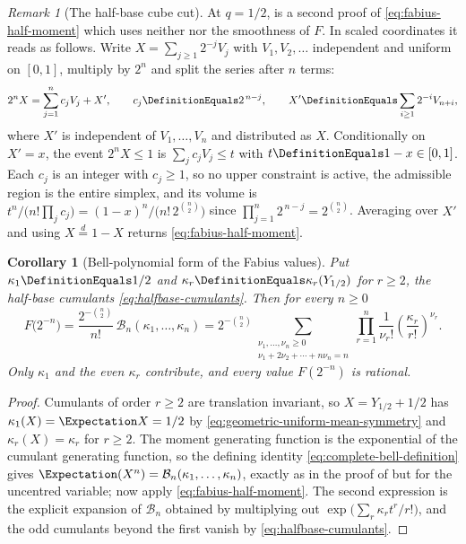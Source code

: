 \documentclass[11pt,a4paper,oneside,openany]{book}
\newtheorem{corollary}[corollary]{Corollary}
\theoremstyle{definition}
\theoremstyle{remark}
\newtheorem{remark}[remark]{Remark}
\begin{document}
\begin{remark}[The half-base cube cut]\label{rem:half-moment-cube-cut}
At $q=1/2$,  is a second proof of
\eqref{eq:fabius-half-moment} which uses neither  nor the smoothness
of $F$.  In scaled coordinates it reads as follows.  Write $X=\sum_{j\ge1}2^{-j}V_j$ with
$V_1,V_2,\ldots$ independent and uniform on $[0,1]$, multiply by $2^n$ and split the
series after $n$ terms:
\begin{equation}\label{eq:fabius-scaled-split}
 2^nX=\sum_{j=1}^{n}c_jV_j+X',
 \qquad c_j\DefinitionEquals2^{\,n-j},
 \qquad X'\DefinitionEquals\sum_{i\ge1}2^{-i}V_{n+i},
\end{equation}
where $X'$ is independent of $V_1,\ldots,V_n$ and distributed as $X$.  Conditionally on
$X'=x$, the event $2^nX\le1$ is $\sum_jc_jV_j\le t$ with $t\DefinitionEquals1-x\in[0,1]$.  Each $c_j$
is an integer with $c_j\ge1$, so no upper constraint is active, the admissible region is
the entire simplex, and its volume is
$t^n/\bigl(n!\prod_jc_j\bigr)=(1-x)^n/\bigl(n!\,2^{\binom n2}\bigr)$ since
$\prod_{j=1}^{n}2^{\,n-j}=2^{\binom n2}$.  Averaging over $X'$ and using
$X\overset d=1-X$ returns \eqref{eq:fabius-half-moment}.
\end{remark}

\begin{corollary}[Bell-polynomial form of the Fabius values]\label{cor:fabius-bell-values}
Put $\kappa_1\DefinitionEquals1/2$ and $\kappa_r\DefinitionEquals\kappa_r(Y_{1/2})$ for $r\ge2$, the half-base
cumulants \eqref{eq:halfbase-cumulants}.  Then for every $n\ge0$
\begin{equation}\label{eq:fabius-bell-value}
 F\bigl(2^{-n}\bigr)
 =\frac{2^{-\binom n2}}{n!}\,\mathcal B_n(\kappa_1,\ldots,\kappa_n)
 =2^{-\binom n2}
 \sum_{\substack{\nu_1,\ldots,\nu_n\ge0\\ \nu_1+2\nu_2+\cdots+n\nu_n=n}}
 \prod_{r=1}^{n}\frac1{\nu_r!}\left(\frac{\kappa_r}{r!}\right)^{\nu_r}.
\end{equation}
Only $\kappa_1$ and the even $\kappa_r$ contribute, and every value $F(2^{-n})$ is
rational.
\end{corollary}

\begin{proof}
Cumulants of order $r\ge2$ are translation invariant, so $X=Y_{1/2}+1/2$ has
$\kappa_1(X)=\Expectation X=1/2$ by \eqref{eq:geometric-uniform-mean-symmetry} and
$\kappa_r(X)=\kappa_r$ for $r\ge2$.  The moment generating function is the exponential of
the cumulant generating function, so the defining identity
\eqref{eq:complete-bell-definition} gives
$\Expectation(X^n)=\mathcal B_n(\kappa_1,\ldots,\kappa_n)$, exactly as in the proof of
 but for the uncentred variable; now apply
\eqref{eq:fabius-half-moment}.  The second expression is the explicit expansion of
$\mathcal B_n$ obtained by multiplying out $\exp\bigl(\sum_r\kappa_rt^r/r!\bigr)$, and the
odd cumulants beyond the first vanish by \eqref{eq:halfbase-cumulants}.
\end{proof}
\end{document}

